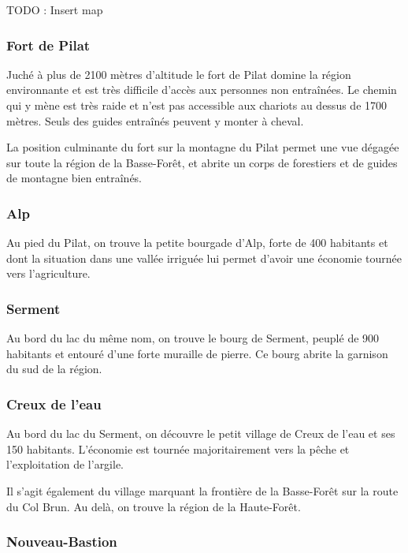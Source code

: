TODO : Insert map

\subsubsection*{Fort de Pilat}

Juché à plus de 2100 mètres d'altitude le fort de Pilat domine la région environnante et est très difficile d'accès aux personnes non entraînées. Le chemin qui y mène est très raide et n'est pas accessible aux chariots au dessus de 1700 mètres. Seuls des guides entraînés peuvent y monter à cheval.

La position culminante du fort sur la montagne du Pilat permet une vue dégagée sur toute la région de la Basse-Forêt, et abrite un corps de forestiers et de guides de montagne bien entraînés.

\subsubsection*{Alp}

Au pied du Pilat, on trouve la petite bourgade d'Alp, forte de 400 habitants et dont la situation dans une vallée irriguée lui permet d'avoir une économie tournée vers l'agriculture.

\subsubsection*{Serment}

Au bord du lac du même nom, on trouve le bourg de Serment, peuplé de 900 habitants et entouré d'une forte muraille de pierre. Ce bourg abrite la garnison du sud de la région.

\subsubsection*{Creux de l'eau}

Au bord du lac du Serment, on découvre le petit village de Creux de l'eau et ses 150 habitants. L'économie est tournée majoritairement vers la pêche et l'exploitation de l'argile.

Il s'agit également du village marquant la frontière de la Basse-Forêt sur la route du Col Brun. Au delà, on trouve la région de la Haute-Forêt.

\subsubsection*{Nouveau-Bastion}

